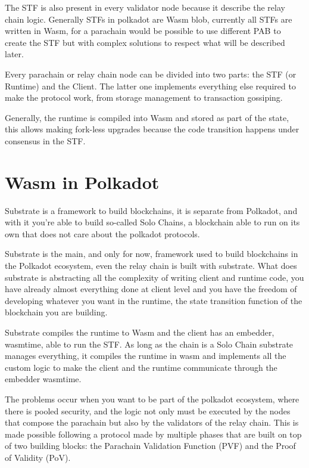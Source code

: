 The STF is also present in every validator node because it describe the relay chain logic. Generally STFs in polkadot are Wasm blob, currently all STFs are written in Wasm, for a parachain would be possible to use different PAB to create the STF but with complex solutions to respect what will be described later.

Every parachain or relay chain node can be divided into two parts: the STF (or Runtime) and the Client. The latter one implements everything else required to make the protocol work, from storage management to transaction gossiping.

Generally, the runtime is compiled into Wasm and stored as part of the state, this allows making fork-less upgrades because the code transition happens under consensus in the STF.

\section{Wasm in Polkadot}

Substrate is a framework to build blockchains, it is separate from Polkadot, and with it you're able to build so-called Solo Chains, a blockchain able to run on its own that does not care about the polkadot protocols.

Substrate is the main, and only for now, framework used to build blockchains in the Polkadot ecosystem, even the relay chain is built with substrate. What does substrate is abstracting all the complexity of writing client and runtime code, you have already almost everything done at client level and you have the freedom of developing whatever you want in the runtime, the state transition function of the blockchain you are building.

Substrate compiles the runtime to Wasm and the client has an embedder, wasmtime, able to run the STF. As long as the chain is a Solo Chain substrate manages everything, it compiles the runtime in wasm and implements all the custom logic to make the client and the runtime communicate through the embedder wasmtime.

The problems occur when you want to be part of the polkadot ecosystem, where there is pooled security, and the logic not only must be executed by the nodes that compose the parachain but also by the validators of the relay chain. This is made possible following a protocol made by multiple phases that are built on top of two building blocks: the Parachain Validation Function (PVF) and the Proof of Validity (PoV).~\cite{parachain-protocol}

